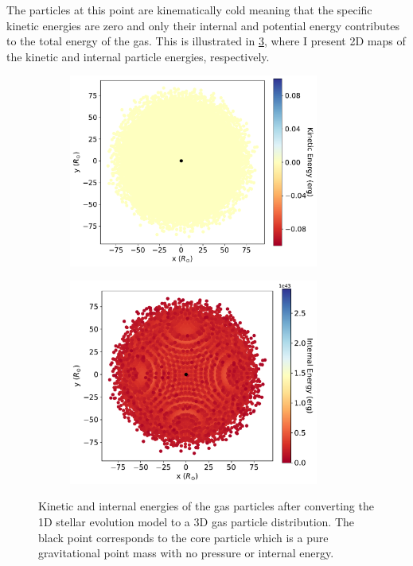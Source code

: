The particles at this point are kinematically cold meaning that the specific kinetic energies are zero and only their internal and potential energy contributes to the total energy of the gas. This is illustrated in \cref{fig:kinetic_internal_energies}, where I present 2D maps of the kinetic and internal particle energies, respectively.
\begin{figure}[H]
    \centering
    \begin{subfigure}{.5\textwidth}
    \centering
    \includegraphics[width=0.9\textwidth]{Thesis/graphs/tertiary_kin_energy_before_relaxation.pdf}
    \label{fig:mass_loss}
    \end{subfigure}%
    \begin{subfigure}{.5\textwidth}
    \centering
    \includegraphics[width=0.9\textwidth]{Thesis/graphs/tertiary_internal_energy_before_relaxation.pdf}
    \label{fig:radius_profile}
    \end{subfigure}
    \caption{ Kinetic and internal energies of the gas particles after converting the 1D stellar evolution model to a 3D gas particle distribution. The black point corresponds to the core particle which is a pure gravitational point mass with no pressure or internal energy.}
    \label{fig:kinetic_internal_energies}
\end{figure}
